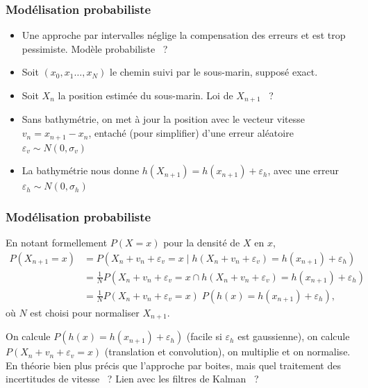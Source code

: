 \documentclass[11pt]{beamer}
\begin{document}
\begin{frame}
  \frametitle{Modélisation probabiliste}
  \begin{itemize}
  \item Une approche par intervalles néglige la compensation des erreurs
    et est trop pessimiste. Modèle probabiliste~ ?
  \item Soit $(x_{0}, x_{1} \dots, x_{N})$ le chemin suivi par le
    sous-marin, supposé exact.
  \item Soit $X_{n}$ la position estimée du sous-marin. Loi de
    $X_{n+1}$~ ?
  \item Sans bathymétrie, on met à jour la position avec le vecteur
    vitesse $v_{n} = x_{n+1} - x_{n}$, entaché (pour simplifier) d'une erreur aléatoire
    $\varepsilon_{v} \sim N(0, \sigma_{v})$
  \item La bathymétrie nous donne $h(X_{n+1}) = h(x_{n+1}) +
    \varepsilon_{h}$, avec une erreur $\varepsilon_{h} \sim N(0, \sigma_{h})$
  \end{itemize}

  \begin{center}
  \end{center}
\end{frame}
\begin{frame}
  \frametitle{Modélisation probabiliste}
  \begin{center}
  \end{center}

  En notant formellement $P(X=x)$ pour la densité de $X$ en $x$,
  \begin{align*}
    P(X_{n+1} = x) &= P(X_{n} + v_{n} + \varepsilon_{v} = x \;\Big|\;
    h(X_{n} + v_{n} + \varepsilon_{v}) = h(x_{n+1}) + 
                     \varepsilon_{h})\\
    &= \frac 1 N P(X_{n} + v_{n} + \varepsilon_{v} = x \cap
    h(X_{n} + v_{n} + \varepsilon_{v}) = h(x_{n+1}) + \varepsilon_{h})\\
    &= \frac 1 N P(X_{n} + v_{n} + \varepsilon_{v} = x) \; P(h(x) = h(x_{n+1}) + \varepsilon_{h}),
  \end{align*}
  où $N$ est choisi pour normaliser $X_{n+1}$.

  On calcule $P(h(x) = h(x_{n+1}) + \varepsilon_{h})$ (facile si
  $\varepsilon_{h}$ est gaussienne), on calcule $P(X_{n} + v_{n} +
  \varepsilon_{v} = x)$ (translation et convolution), on multiplie et on
  normalise. En théorie bien plus précis que l'approche par boites,
  mais quel traitement des incertitudes de vitesse~ ? Lien avec les
  filtres de Kalman~ ?
\end{frame}
\end{document}
